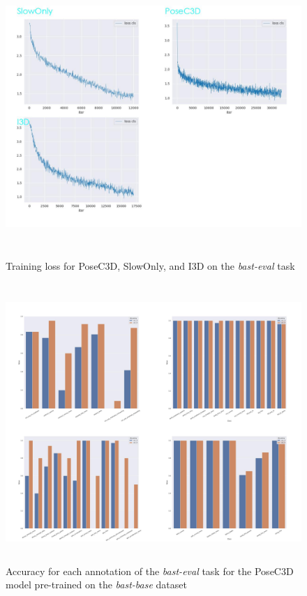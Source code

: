 \documentclass[extern,palatino]{cgMA}
\begin{document}
\begin{figure}[h]
\center
\includegraphics[height={300pt}, width={430pt}]{Thesis/images/3D_models_eval_loss.jpg}
\caption{Training loss for PoseC3D, SlowOnly, and I3D on the \textit{bast-eval} task}
\label{fig:3d_models_eval_loss}
\end{figure}

\begin{figure}[h]
\center
\includegraphics[height={300pt}, width={430pt}]{Thesis/images/acc_per_class_bast_eval.jpg}
\caption{Accuracy for each annotation of the \textit{bast-eval} task for the PoseC3D model pre-trained on the \textit{bast-base} dataset}
\label{fig:acc_per_class_bast_eval}
\end{figure}
\end{document}
